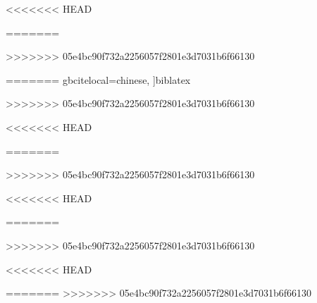 \usepackage{graphicx}
\usepackage{geometry}
\usepackage{tabularx}
\usepackage{multido}
\usepackage{fancyhdr}
\usepackage{fontspec}
\usepackage{titlesec}
<<<<<<< HEAD
\usepackage[subfigure]{tocloft}
=======
\usepackage{tocloft}
>>>>>>> 05e4bc90f732a2256057f2801e3d7031b6f66130
\usepackage{multirow}
\usepackage{makecell}
\usepackage{hyperref}
\usepackage{ulem}
\usepackage{pdfpages}
\usepackage[
    style=gb7714-2015,
<<<<<<< HEAD
    gbcitelocal=chinese,
    gbnamefmt=lowercase,
    gbpunctin=false,
]{biblatex}
\usepackage{siunitx}
\usepackage{caption}
\usepackage{color}
\usepackage{colortbl}
=======
    gbcitelocal=chinese,   %
]{biblatex}
\usepackage{siunitx}
\usepackage{caption}
\usepackage{color}
>>>>>>> 05e4bc90f732a2256057f2801e3d7031b6f66130
\usepackage{chngcntr}
\usepackage{enumitem}
\usepackage{float}
\usepackage{listings}
<<<<<<< HEAD
\usepackage{amssymb, amsmath, ntheorem}
=======
\usepackage{amssymb}
>>>>>>> 05e4bc90f732a2256057f2801e3d7031b6f66130
\usepackage{etoolbox}
\usepackage{xparse}
\usepackage{bookmark}
\usepackage{calc}
\usepackage{longtable}
\usepackage{booktabs}
<<<<<<< HEAD
\usepackage[ruled,vlined]{algorithm2e}
\usepackage{pseudocode}
\usepackage{emptypage}
\usepackage{diagbox}
\usepackage{soul}
\usepackage{setspace}
\usepackage{subfigure}

\usepackage{tikz}   %
=======
\usepackage[chapter]{algorithm}
\usepackage{algorithmic}
\usepackage{mathptmx} %

\usepackage{tikz}   %
\usepackage{subfig,graphicx} %
>>>>>>> 05e4bc90f732a2256057f2801e3d7031b6f66130
\usepackage{bbding} %
\usepackage{pifont} %
\usepackage{amsmath} %
\usepackage{tabularray} %
<<<<<<< HEAD

=======
>>>>>>> 05e4bc90f732a2256057f2801e3d7031b6f66130
